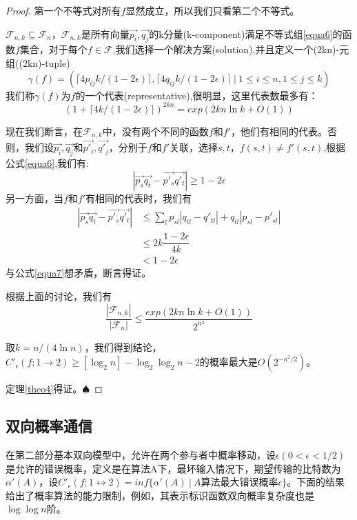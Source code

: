 \documentclass[]{article}
\newtheorem*{proof}{证明}
\begin{document}
	\begin{proof}
		第一个不等式对所有$f$显然成立，所以我们只看第二个不等式。\par
		$\mathscr{F}_{n,k}\subseteq \mathscr{F}_n$，$\mathscr{F}_{n,k}$是所有向量$\vec{p_i},\vec{q_j}$的k分量(k-component)满足不等式组\ref{equa6}的函数$f$集合，对于每个$f\in \mathscr{F}$,我们选择一个解决方案(solution),并且定义一个(2kn)-元组((2kn)-tuple)
		\[\gamma(f) = (\lceil 4 p_{ij}k/(1-2\epsilon)  \rceil , \lceil4q_{ij}k/(1-2\epsilon) \rceil \ |\ 1\leq i\leq n,1 \leq j \leq k )\]
		我们称$\gamma(f)$为$f$的一个代表(representative),很明显，这里代表数最多有：
		\[(1+\lceil 4k/(1-2\epsilon)\rceil )^{2kn} =exp(2kn \ln k + O(1))\]
		\par
		现在我们断言，在$\mathscr{F}_{n,k}$中，没有两个不同的函数$f$和$f'$，他们有相同的代表。否则，我们设$\vec{p_i},\vec{q_j}$和$\vec{p'_i},\vec{q'_j}$，分别于$f$和$f'$关联，选择$s,t$，$f(s,t)\neq f'(s,t)$,根据公式\ref{equa6},我们有:\\
		\begin{equation}\label{equa7}
			| \vec{p_s}\vec{q_t} - \vec{p'_s}\vec{q'_t} | \geq 1-2\epsilon
		\end{equation}
		另一方面，当$f$和$f'$有相同的代表时，我们有
		\begin{equation}\nonumber
			\begin{aligned}
			    \left| \vec{p_s} \vec{q_t} - \vec{p'_s} \vec{q'_t} \right|  & \leq \sum_{l} p_{sl}|q_{tl}-q'_{tl}|+ q_{tl}|p_{sl}-p'_{sl}|\\
		                                                       & \leq 2k\dfrac{1-2\epsilon}{4k}  \\
		                                                       & < 1-2\epsilon
			\end{aligned}
		\end{equation}
		与公式\ref{equa7}想矛盾，断言得证。\par
		根据上面的讨论，我们有
		\[\dfrac{|\mathscr{F}_{n,k}|}{|\mathscr{F}_n|} \leq \dfrac{exp(2kn\ln k +O(1))}{2^{n^2}}\]
	
	    取$k=n/(4\ln n)$，我们得到结论，$C'_\epsilon (f;1 \rightarrow 2) \geq [\log_2 n]-\log_2 \log_2 n -2$的概率最大是$O(2^{-n^2/2})$。
		\par
		定理\ref{theo4}得证。$\spadesuit$
	\end{proof}
	
	\subsection{双向概率通信}
	在第二部分基本双向模型中，允许在两个参与者中概率移动，设$\epsilon(0<\epsilon<1/2)$是允许的错误概率，定义是在算法A下，最坏输入情况下，期望传输的比特数为$\alpha'(A)$，设$C'_\epsilon(f;1\leftrightarrow 2)=inf\{\alpha'(A)\ |\ A \text{算法最大错误概率}\epsilon\}$。下面的结果给出了概率算法的能力限制，例如，其表示标识函数双向概率复杂度也是$\log \log n$阶。\par
	
\end{document}
